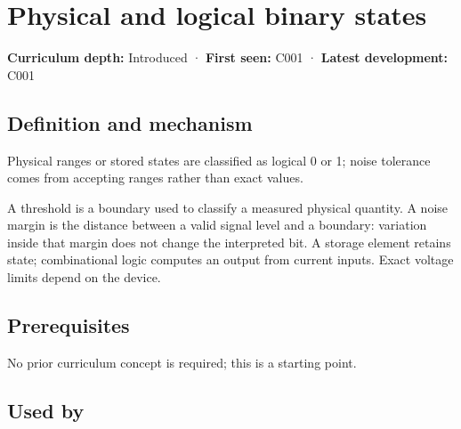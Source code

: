 \hypertarget{appendix-ea798b1ceb35}{}\label{referencestart:appendix-ea798b1ceb35}
\section{Physical and logical binary states}\label{appendix-ea798b1ceb35-physical-and-logical-binary-states}

\hypertarget{appendix-ea798b1ceb35-physical-and-logical-binary-states}{}

\textbf{Curriculum depth:} Introduced · \textbf{First seen:} C001 · \textbf{Latest development:} C001

\begin{allmightroledefinition}

\subsection{Definition and mechanism}\label{appendix-ea798b1ceb35-definition-and-mechanism}

\hypertarget{appendix-ea798b1ceb35-definition-and-mechanism}{}

Physical ranges or stored states are classified as logical 0 or 1; noise tolerance comes from accepting ranges rather than exact values.

\end{allmightroledefinition}

A threshold is a boundary used to classify a measured physical quantity. A noise margin is the distance between a valid signal level and a boundary: variation inside that margin does not change the interpreted bit. A storage element retains state; combinational logic computes an output from current inputs. Exact voltage limits depend on the device.

\subsection{Prerequisites}\label{appendix-ea798b1ceb35-prerequisites}

\hypertarget{appendix-ea798b1ceb35-prerequisites}{}

No prior curriculum concept is required; this is a starting point.

\subsection{Used by}\label{appendix-ea798b1ceb35-used-by}

\hypertarget{appendix-ea798b1ceb35-used-by}{}

